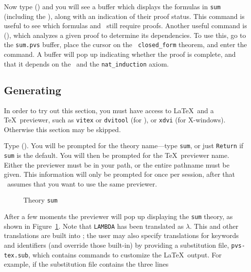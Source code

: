 Now type  () and you will see a
buffer which displays the formulas in {\tt sum} (including the \tccs),
along with an indication of their proof status.  This command is
useful to see which formulas and \tccs\ still require proofs.  Another
useful command is  (), which
analyzes a given proof to determine its dependencies.  To use this,
go to the {\tt sum.pvs} buffer, place the cursor on the {\tt
closed\_form} theorem, and enter the command.  A buffer will pop up
indicating whether the proof is complete, and that it depends on the
\tccs\ and the {\tt nat\_induction} axiom.

\subsection[Generating \LaTeX]{Generating \BoldLaTeX}

In order to try out this section, you must have access to \LaTeX\ and a
\TeX\ previewer, such as {\tt vitex} or {\tt dvitool} (for \sunview), or
{\tt xdvi} (for X-windows).  Otherwise this section may be skipped.

Type  ().  You will be prompted for
the theory name---type {\tt sum}, or just {\tt Return} if {\tt sum} is
the default.  You will then be prompted for the \TeX\ previewer name.
Either the previewer must be in your path, or the entire pathname must
be given.  This information will only be prompted for once per session,
after that \pvs\ assumes that you want to use the same previewer.

\begin{figure}[ht]
\begin{center}
\begin{boxedminipage}{\textwidth}
{\smaller\smaller }
\end{boxedminipage}
\end{center}
\caption{Theory {\tt sum}}\label{sum-plain}
\end{figure}

After a few moments the previewer will pop up displaying the {\tt sum}
theory, as shown in Figure~\ref{sum-plain}.  Note that {\tt LAMBDA}
has been translated as $\lambda$.  This and other translations are
built into \pvs; the user may also specify translations for keywords
and identifiers (and override those built-in) by providing a
substitution file, {\tt pvs-tex.sub}, which contains commands to
customize the \LaTeX\ output.  For example, if the substitution file
contains the three lines

